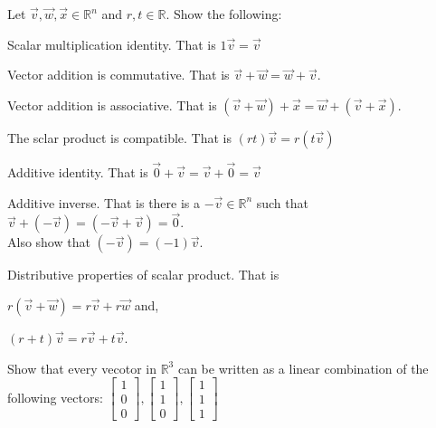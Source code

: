 \begin{exercise}
Let $\vec{v},\vec{w},\vec{x} \in \mathbb{R}^n$ and $r,t \in \mathbb{R}$. Show the following:\\
\begin{inparaenum}[a.)]
\item Scalar multiplication identity. That is $1 \vec{v}=\vec{v}$\\
\item Vector addition is commutative. That is $\vec{v}+\vec{w}=\vec{w}+\vec{v}$.\\
\item Vector addition is associative. That is $(\vec{v}+\vec{w})+\vec{x}=\vec{w}+(\vec{v}+\vec{x})$.\\
\item The sclar product is compatible. That is $(rt) \vec{v}=r(t \vec{v})$\\
\item Additive identity. That is $\vec{0}+\vec{v}=\vec{v}+\vec{0}=\vec{v}$\\
\item Additive inverse. That is there is a $-\vec{v} \in \mathbb{R}^n$ such that $\vec{v}+(-\vec{v})=(-\vec{v}+\vec{v})=\vec{0}$. \\
Also show that $(-\vec{v})=(-1)\vec{v}$.
\item Distributive properties of scalar product. That is\\
\begin{inparaenum}[\ \ \ \ i.)]
\item  $r(\vec{v}+\vec{w})=r\vec{v}+r\vec{w}$ and,\\
\item  $(r+t)\vec{v}=r\vec{v}+t\vec{v}$.\\
\end{inparaenum}
\end{inparaenum} 
\end{exercise}


\begin{exercise}
Show that every vecotor in $\mathbb{R}^3$ can be written as a linear combination of the following vectors: $\begin{bmatrix}1\\ 0 \\ 0\end{bmatrix}, \begin{bmatrix}1\\ 1 \\ 0\end{bmatrix},\begin{bmatrix}1\\ 1 \\ 1\end{bmatrix}$
\end{exercise}


